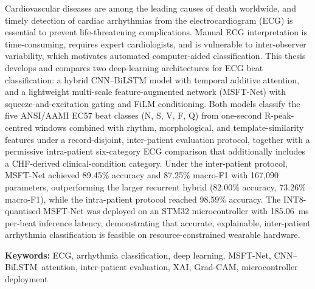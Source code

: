 %


Cardiovascular diseases are among the leading causes of death worldwide,
and timely detection of cardiac arrhythmias from the electrocardiogram
(ECG) is essential to prevent life-threatening complications. Manual ECG
interpretation is time-consuming, requires expert cardiologists, and is
vulnerable to inter-observer variability, which motivates automated
computer-aided classification. This thesis develops and compares two
deep-learning architectures for ECG beat classification: a hybrid
CNN--BiLSTM model with temporal additive attention, and a lightweight
multi-scale feature-augmented network (MSFT-Net) with squeeze-and-excitation
gating and FiLM conditioning. Both models classify the five ANSI/AAMI EC57
beat classes (N, S, V, F, Q) from one-second R-peak-centred windows combined
with rhythm, morphological, and template-similarity features under a
record-disjoint, inter-patient evaluation protocol, together with a
permissive intra-patient six-category ECG comparison that additionally
includes a CHF-derived clinical-condition category. Under the inter-patient
protocol, MSFT-Net achieved 89.45\% accuracy and 87.25\% macro-F1 with
167{,}090 parameters, outperforming the larger recurrent hybrid (82.00\%
accuracy, 73.26\% macro-F1), while the intra-patient protocol reached 98.59\%
accuracy. The INT8-quantised MSFT-Net was deployed on an STM32
microcontroller with 185.06~ms per-beat inference latency, demonstrating
that accurate, explainable, inter-patient arrhythmia classification is
feasible on resource-constrained wearable hardware.

\vspace{18pt}

\noindent
\textbf{Keywords:} ECG, arrhythmia classification, deep learning,
MSFT-Net, CNN--BiLSTM--attention, inter-patient evaluation, XAI, Grad-CAM,
microcontroller deployment

\clearpage
